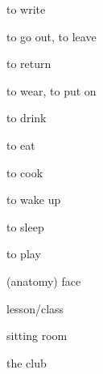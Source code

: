 \begin{flashcard}{\LARGE to write}
\LARGE {}
\end{flashcard}
\begin{flashcard}{\LARGE to go out, to leave}
\LARGE {}
\end{flashcard}
\begin{flashcard}{\LARGE to return}
\LARGE {}
\end{flashcard}
\begin{flashcard}{\LARGE to wear, to put on}
\LARGE {}
\end{flashcard}
\begin{flashcard}{\LARGE to drink}
\LARGE {}
\end{flashcard}
\begin{flashcard}{\LARGE to eat}
\LARGE {}
\end{flashcard}
\begin{flashcard}{\LARGE to cook}
\LARGE {}
\end{flashcard}
\begin{flashcard}{\LARGE to wake up}
\LARGE {}
\end{flashcard}
\begin{flashcard}{\LARGE to sleep}
\LARGE {}
\end{flashcard}
\begin{flashcard}{\LARGE to play}
\LARGE {}
\end{flashcard}
\begin{flashcard}{\LARGE (anatomy) face}
\LARGE {}
\end{flashcard}
\begin{flashcard}{\LARGE lesson/class}
\LARGE {}
\end{flashcard}
\begin{flashcard}{\LARGE sitting room}
\LARGE {}
\end{flashcard}
\begin{flashcard}{\LARGE the club}
\LARGE {}
\end{flashcard}
